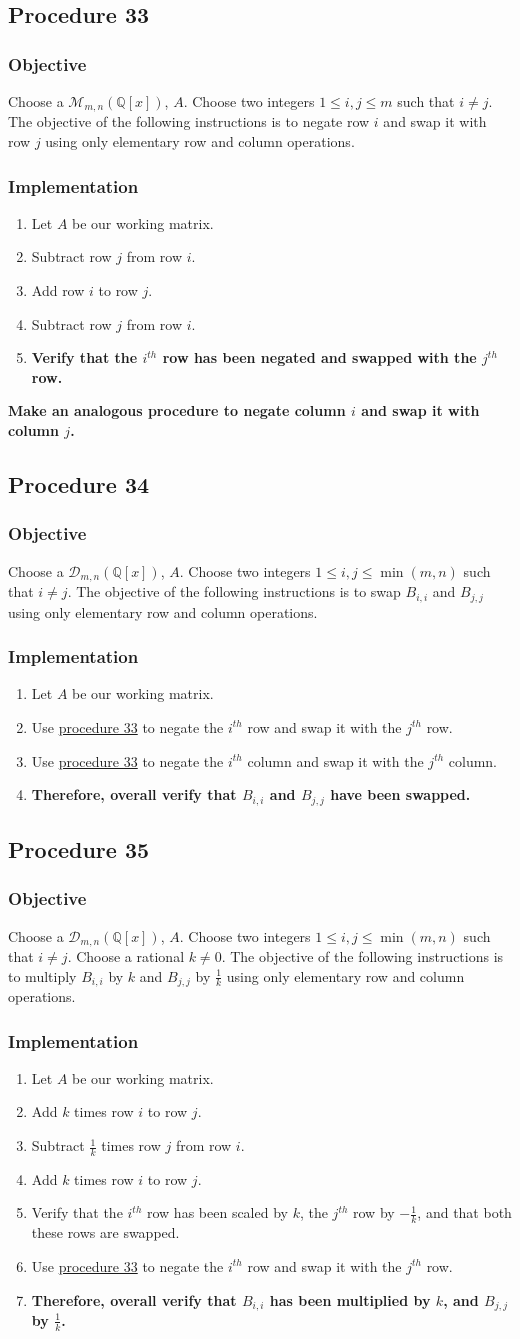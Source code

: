\documentclass[twocolumn]{article}
\newcommand{\procedure}[2][]{\subsection*{Procedure #2 \ifthenelse{\equal{#1}{}}{}{(#1)}}\label{sec:procedure #2}}
\newcommand{\objective}{\subsubsection*{Objective}}
\newcommand{\implementation}{\subsubsection*{Implementation}}
\begin{document}
		\procedure{33}
			\objective
				Choose a $\mathcal{M}_{m,n}(\mathbb{Q}[x])$, $A$. Choose two integers $1\le i,j\le m$ such that $i\ne j$. The objective of the following instructions is to negate row $i$ and swap it with row $j$ using only elementary row and column operations.
			\implementation
				\begin{enumerate}
					\item Let $A$ be our working matrix.
					\item Subtract row $j$ from row $i$.
					\item Add row $i$ to row $j$.
					\item Subtract row $j$ from row $i$.
					\item \textbf{Verify that the $i^{th}$ row has been negated and swapped with the $j^{th}$ row.}
				\end{enumerate}
		\textbf{Make an analogous procedure to negate column $i$ and swap it with column $j$.}
		\procedure{34}
			\objective
				Choose a $\mathcal{D}_{m,n}(\mathbb{Q}[x])$, $A$. Choose two integers $1\le i,j\le\min(m,n)$ such that $i\ne j$. The objective of the following instructions is to swap $B_{i,i}$ and $B_{j,j}$ using only elementary row and column operations.
			\implementation
				\begin{enumerate}
					\item Let $A$ be our working matrix.
					\item Use \hyperref[sec:procedure 33]{procedure 33} to negate the $i^{th}$ row and swap it with the $j^{th}$ row.
					\item Use \hyperref[sec:procedure 33]{procedure 33} to negate the $i^{th}$ column and swap it with the $j^{th}$ column.
					\item \textbf{Therefore, overall verify that $B_{i,i}$ and $B_{j,j}$ have been swapped.}
				\end{enumerate}
		\procedure{35}
			\objective
				Choose a $\mathcal{D}_{m,n}(\mathbb{Q}[x])$, $A$. Choose two integers $1\le i,j\le\min(m,n)$ such that $i\ne j$. Choose a rational $k\ne 0$. The objective of the following instructions is to multiply $B_{i,i}$ by $k$ and $B_{j,j}$ by $\frac{1}{k}$ using only elementary row and column operations.
			\implementation
				\begin{enumerate}
					\item Let $A$ be our working matrix.
					\item Add $k$ times row $i$ to row $j$.
					\item Subtract $\frac{1}{k}$ times row $j$ from row $i$.
					\item Add $k$ times row $i$ to row $j$.
					\item Verify that the $i^{th}$ row has been scaled by $k$, the $j^{th}$ row by $-\frac{1}{k}$, and that both these rows are swapped.
					\item Use \hyperref[sec:procedure 33]{procedure 33} to negate the $i^{th}$ row and swap it with the $j^{th}$ row.
					\item \textbf{Therefore, overall verify that $B_{i,i}$ has been multiplied by $k$, and $B_{j,j}$ by $\frac{1}{k}$.}
				\end{enumerate}
\end{document}
